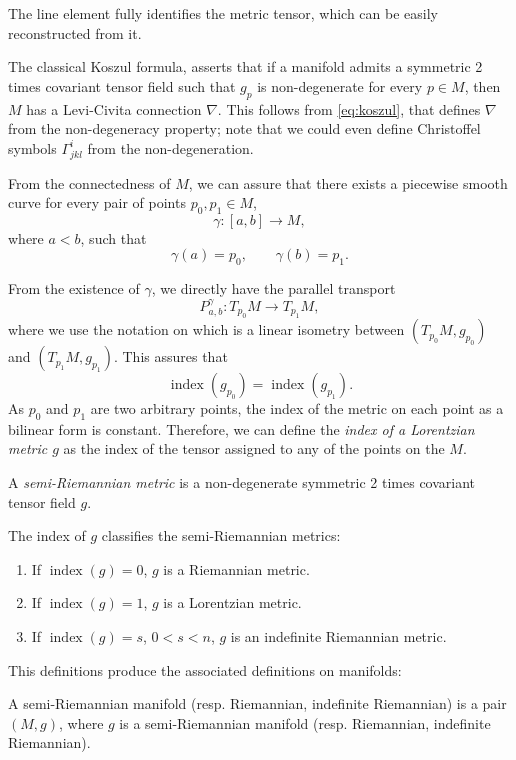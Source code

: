 The line element fully identifies the metric tensor, which can be easily reconstructed from it.

The classical Koszul formula, asserts that if a manifold admits a symmetric 2 times covariant tensor field such that $g_p$ is non-degenerate for every $p \in M$, then $M$ has a Levi-Civita connection $\nabla$.  This follows from \autoref{eq:koszul}, that defines $\nabla$ from the non-degeneracy property; note that we could even define Christoffel symbols $\Gamma^i_{jkl}$ from the non-degeneration.

From the connectedness of $M$, we can assure that there exists a piecewise smooth curve for every pair of points $p_0, p_1 \in M$,
\[
\gamma \colon [a,b] \to M,
\]
where $a < b$, such that
\[
\gamma(a) = p_0, \qquad \gamma(b) = p_1.
\]

From the existence of $\gamma$, we directly have the parallel transport
\[
P^\gamma_{a,b} \colon T_{p_0}M \to T_{p_1}M,
\]
where we use the notation on \cite[Prop 3.19]{oneill83} which is a linear isometry between $(T_{p_0}M, g_{p_0})$ and $(T_{p_1}M, g_{p_1})$. This assures that
\[
\operatorname{index}(g_{p_0}) = \operatorname{index}(g_{p_1}).
\]
As $p_0$ and $p_1$ are two arbitrary points, the index of the metric on each point as a bilinear form is constant. Therefore, we can define the \emph{index of a Lorentzian metric $g$} as the index of the tensor assigned to any of the points on the $M$.

\begin{definition}
	A \emph{semi-Riemannian metric} is a non-degenerate symmetric 2 times covariant tensor field $g$.
\end{definition}

The index of $g$ classifies the semi-Riemannian metrics:
\begin{enumerate}
	\item If $\operatorname{index}(g) = 0$, $g$ is a Riemannian metric.
	\item If $\operatorname{index}(g) = 1$, $g$ is a Lorentzian metric.
	\item If $\operatorname{index}(g) = s$, $0 < s < n$, $g$ is an indefinite Riemannian metric.
\end{enumerate}

This definitions produce the associated definitions on manifolds:
\begin{definition}
	A semi-Riemannian manifold (resp. Riemannian, indefinite Riemannian) is a pair $(M,g)$, where $g$ is a semi-Riemannian manifold (resp. Riemannian, indefinite Riemannian).
\end{definition}


